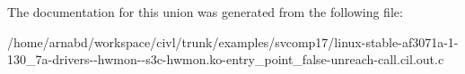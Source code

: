 The documentation for this union was generated from the following file\+:\begin{DoxyCompactItemize}
\item 
/home/arnabd/workspace/civl/trunk/examples/svcomp17/linux-\/stable-\/af3071a-\/1-\/130\+\_\+7a-\/drivers-\/-\/hwmon-\/-\/s3c-\/hwmon.\+ko-\/entry\+\_\+point\+\_\+false-\/unreach-\/call.\+cil.\+out.\+c\end{DoxyCompactItemize}
